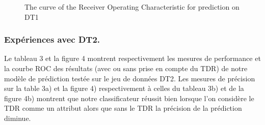 \begin{figure}[!h]
\centering
{}%
\caption{The curve of the Receiver Operating Characteristic for prediction on DT1}\label{curve_roc_dt1}
\end{figure}
\subsubsection{Expériences avec DT2.}
Le tableau 3 et la figure 4 montrent respectivement les mesures de performance et la courbe ROC des résultats (avec ou sans prise en compte du TDR) de notre modèle de prédiction testée sur le jeu de données DT2. Les mesures de précision sur la table 3a) et la figure 4) respectivement à celles du tableau 3b) et de la figure 4b) montrent que notre classificateur réussit bien lorsque l'on considère le  TDR comme un attribut alors que sans le TDR la précision de la prédiction diminue.
\begin{table}[!h]
\centering
{}%
\hspace*{0.5cm}
%
\label{perf-measure-dt2}\caption{Performance measures of the prediction on DT2}
\end{table}

